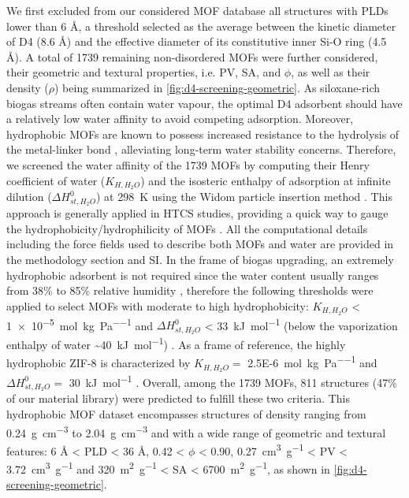 We first excluded from our considered MOF database all structures with PLDs
lower than 6 Å, a threshold selected as the average between the kinetic diameter
of D4 (8.6 Å) and the effective diameter of its constitutive inner Si-O ring
(4.5 Å). A total of 1739 remaining non-disordered MOFs were further considered,
their geometric and textural properties, i.e. PV, SA, and \(\phi\), as well as
their density (\(\rho\)) being summarized in \cref{fig:d4-screening-geometric}.
As siloxane-rich biogas streams often contain water vapour, the optimal D4
adsorbent should have a relatively low water affinity to avoid competing
adsorption. Moreover, hydrophobic MOFs are known to possess increased resistance
to the hydrolysis of the metal-linker bond
\citep{burtchWaterStabilityAdsorption2014,
wuEnhancingStabilityMetalorganic2010}, alleviating long-term water stability
concerns. Therefore, we screened the water affinity of the 1739 MOFs by
computing their Henry coefficient of water (\(K_{H,H_{2}O}\)) and the isosteric
enthalpy of adsorption at infinite dilution (\(\Delta H_{st,H_{2}O}^{0}\)) at
\SI{298}{\kelvin} using the Widom particle insertion method
\citep{frenkelUnderstandingMolecularSimulation2002}. This approach is generally
applied in HTCS studies, providing a quick way to gauge the
hydrophobicity/hydrophilicity of MOFs
\citep{matito-martosDiscoveryOptimalPorous2018,
qiaoHighthroughputComputationalScreening2017}. All the computational details
including the force fields used to describe both MOFs and water are provided in
the methodology section and SI. In the frame of biogas upgrading, an extremely
hydrophobic adsorbent is not required since the water content usually ranges
from 38\% to 85\% relative humidity \citep{wangRecentAdvancesTechnologies2019},
therefore the following thresholds were applied to select MOFs with moderate to
high hydrophobicity: \(K_{H,H_{2}O}\) < \SI{1e-5}{\mol\per\kilo\gram\per\pascal}
and \(\Delta H_{st,H_{2}O}^{0}\) < \SI{33}{\kilo\joule\per\mol} (below the
vaporization enthalpy of water \textasciitilde \SI{40}{\kilo\joule\per\mol})
\citep{lemmonNISTStandardReference2018}. As a frame of reference, the highly
hydrophobic ZIF-8 is characterized by \(K_{H,H_{2}O} =\)
\SI{2.5E-6}{\mol\per\kilo\gram\per\pascal} and \(\Delta H_{st,H_{2}O}^{0} = \)
\SI{30}{\kilo\joule\per\mol}
\citep{moghadamEfficientIdentificationHydrophobic2016}. Overall, among the 1739
MOFs, 811 structures (47\% of our material library) were predicted to fulfill
these two criteria. This hydrophobic MOF dataset encompasses structures of
density ranging from \SI{0.24}{\gram\per\centi\metre\cubed} to
\SI{2.04}{\gram\per\centi\metre\cubed} and with a wide range of geometric and
textural features: 6 Å < PLD < 36 Å, 0.42 < \(\phi\) < 0.90,
\SI{0.27}{\centi\metre\cubed\per\gram} < PV <
\SI{3.72}{\centi\metre\cubed\per\gram} and \SI{320}{\metre\squared\per\gram} <
SA < \SI{6700}{\metre\squared\per\gram}, as shown in
\cref{fig:d4-screening-geometric}.

